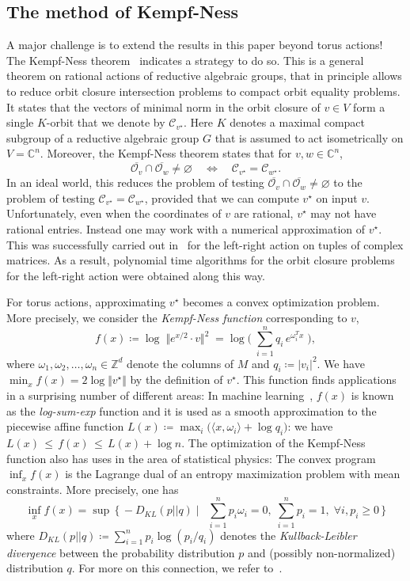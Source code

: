 \documentclass[a4paper,USenglish,cleveref,numberwithinsect]{lipics-v2021}
\newcommand{\CC}{\mathbb{C}}
\newcommand{\ZZ}{\mathbb{Z}}
\newcommand{\OO}{\ensuremath{\mathcal{O}}}
\newcommand{\KK}{\ensuremath{\mathcal{C}}}
\numberwithin{equation}{section}
\begin{document}
\subsection{The method of Kempf-Ness}
A major challenge is to extend the results in this paper beyond torus actions!
The Kempf-Ness theorem~\cite{kempfness} indicates a strategy to do so.
This is a general theorem on rational actions of reductive algebraic groups,
that in principle allows to reduce orbit closure intersection problems
to compact orbit equality problems.
It states that the vectors of minimal norm in the orbit closure of $v\in V$
form a single $K$-orbit that we denote by $\KK_{v^\star}$.
Here $K$ denotes a maximal compact subgroup of a reductive algebraic group $G$
that is assumed to act isometrically on $V=\CC^n$.
Moreover, the Kempf-Ness theorem states that for $v,w\in\CC^n$,
\[
 \overline{\OO_v}\cap\overline{\OO_w}\neq\varnothing \quad \iff\quad \KK_{v^\star}=\KK_{w^\star}.
\]
In an ideal world, this reduces the problem of testing
$\overline{\OO_v}\cap\overline{\OO_w}\neq\varnothing$
to the problem of testing $\KK_{v^\star}=\KK_{w^\star}$,
provided that we can compute $v^\star$ on input $v$.
Unfortunately, even when the coordinates of $v$ are rational,
$v^\star$ may not have rational entries.
Instead one may work with a numerical approximation of $v^\star$.
This was successfully carried out in~\cite{AZGLOW}
for the left-right action on tuples of complex matrices.
As a result, polynomial time algorithms for the orbit closure problems for the left-right action were obtained along this way.

For torus actions, approximating $v^\star$ becomes a convex optimization problem. More precisely, we consider the \emph{Kempf-Ness function} corresponding to $v$, \[
f(x) \coloneqq \log\; \Vert e^{x/2}\cdot v\Vert^2 \; = \log\Big(\;\sum_{i=1}^n q_i\, e^{\omega_i^T x}\;\Big),
\] where $\omega_1,\omega_2,\dots,\omega_n\in\ZZ^d$ denote the columns of $M$ and $q_i\coloneqq |v_i|^2$. We have $\min_x f(x)=2\log\Vert v^\star\Vert$ by the definition of $v^\star$. This function finds applications in a surprising number of different areas: In machine learning~\cite{ml-lse-1, ml-lse-2, ml-lse-3, ml-tropical},
$f(x)$ is known as the \textit{log-sum-exp} function and it is used as a smooth approximation
to the piecewise affine function $L(x)\coloneqq \max_i \big(\langle x,\omega_i\rangle +\log q_i\big)$: we have
$
 L(x) \,\leq\, f(x) \,\leq\, L(x) + \log n .
$
The optimization of the Kempf-Ness function also has uses in the area of statistical physics: The convex program $\inf_x f(x)$ is the Lagrange dual of an entropy maximization problem with mean constraints. More precisely, one has \[
\inf_x f(x) = \sup\, \Big\{\,  -D_{KL}(p||q)\; \Big| \; \ \; \sum_{i=1}^n p_i \omega_i =0,\; \sum_{i=1}^n p_i=1,\; \forall i, p_i\geq 0\, \Big\}
\] where $D_{KL}(p || q)\coloneqq \sum_{i=1}^n p_i \log(p_i/q_i)$ denotes the \emph{Kullback-Leibler divergence} between the probability distribution $p$ and (possibly non-normalized) distribution $q$. For more on this connection, we refer to~\cite{vishnoi-singh,vishnoi-straszak,leake-vishnoi,BLNW:20}.
\end{document}

